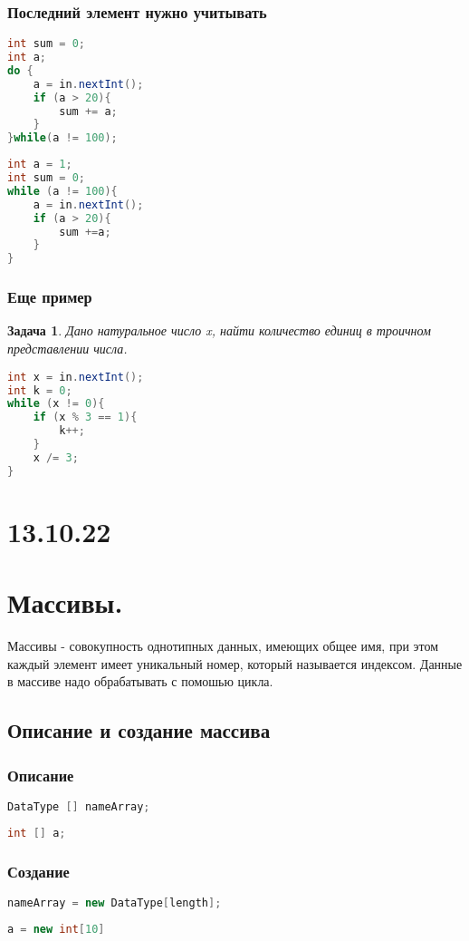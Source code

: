 \documentclass{article}
\newtheorem{task}{Задача}
\begin{document}
\subsubsection{Последний элемент нужно учитывать}
\begin{lstlisting}[language=Java] 
int sum = 0;
int a;
do {
    a = in.nextInt();
    if (a > 20){
        sum += a;
    }
}while(a != 100);
\end{lstlisting}
\begin{lstlisting}[language=Java] 
int a = 1;
int sum = 0;
while (a != 100){
    a = in.nextInt();
    if (a > 20){
        sum +=a;
    }
} 
\end{lstlisting}
\subsubsection{Еще пример}
\begin{task}
	Дано натуральное число x, найти количество единиц в троичном представлении числа.
\end{task}
\begin{lstlisting}[language=Java] 
int x = in.nextInt();
int k = 0;
while (x != 0){
    if (x % 3 == 1){
        k++;
    }
    x /= 3;
}
\end{lstlisting}
\section*{13.10.22}
\section{Массивы.}
Массивы - совокупность однотипных данных, имеющих общее имя, при этом каждый элемент имеет
уникальный номер, который называется индексом.
Данные в массиве надо обрабатывать с помошью цикла.
\subsection{Описание и создание массива}
\subsubsection{Описание}
\begin{lstlisting}[language=Java] 
DataType [] nameArray; 
\end{lstlisting}
\begin{lstlisting}[language=Java] 
int [] a; 
\end{lstlisting}
\subsubsection{Создание}
\begin{lstlisting}[language=Java] 
nameArray = new DataType[length]; 
\end{lstlisting}
\begin{lstlisting}[language=Java] 
a = new int[10] 
\end{lstlisting}
\end{document}
